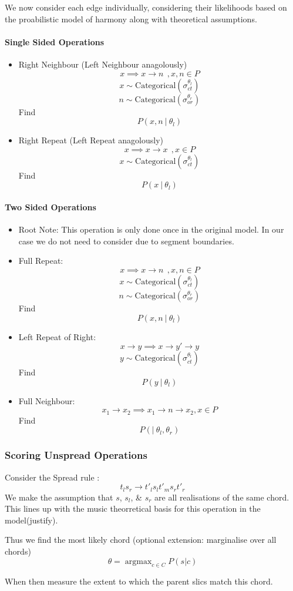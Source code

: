 \documentclass[12pt,a4paper,twoside,openright]{report}
\theoremstyle{definition}
\begin{document}
We now consider each edge individually, considering their likelihoods based on the proabilistic model of harmony along with theoretical assumptions. 

\paragraph{Single Sided Operations} 
\begin{itemize}
  \item Right Neighbour (Left Neighbour anagolously)
    \[ x \implies x \to n~~, x,n \in P \]
    \[x \sim \text{Categorical}(\sigma_{ct}^{\theta_l})\]
    \[n \sim \text{Categorical}(\sigma_{or}^{\theta_r})\]
    Find \[P(x,n~|~\theta_l)\]
  \item Right Repeat (Left Repeat anagolously)
    \[ x \implies x \to x~~, x \in P \]
    \[x \sim \text{Categorical}(\sigma_{ct}^{\theta_l})\]
    Find \[P(x~|~\theta_l)\]
\end{itemize}
\paragraph{Two Sided Operations} 
\begin{itemize}
  \item Root Note: This operation is only done once in the original model. In our case we do not need to consider due to segment boundaries.
  \item Full Repeat: 
    \[ x \implies x \to n~~, x,n \in P \]
    \[x \sim \text{Categorical}(\sigma_{ct}^{\theta_l})\]
    \[n \sim \text{Categorical}(\sigma_{or}^{\theta_r})\]
    Find \[P(x,n~|~\theta_l)\]
  \item Left Repeat of Right: 
    \[ x \to y \implies x \to y' \to y \]
    \[y \sim \text{Categorical}(\sigma_{ct}^{\theta_l})\]
    Find \[P(y~|~\theta_l)\]
  \item Full Neighbour:
    \[ x_1 \to x_2 \implies x_1 \to n \to x_2, x \in P \]
    Find \[P(|~\theta_l,\theta_r)\]
\end{itemize}

\FloatBarrier
\subsubsection{Scoring Unspread Operations}

Consider the Spread rule : \[t_l s_r \to t'_l s_l t'_m s_r t'_r\]
We make the assumption that $s$, $s_l$, \& $s_r$ are all realisations of the same chord. This lines up with the music theorretical basis for this operation in the model(justify).
\par 
Thus we find the most likely chord (optional extension: marginalise over all chords)
\[\theta = \mathop{argmax}_{c \in C} P (s|c)\]
\par 
When then measure the extent to which the parent slics match this chord.
\end{document}
